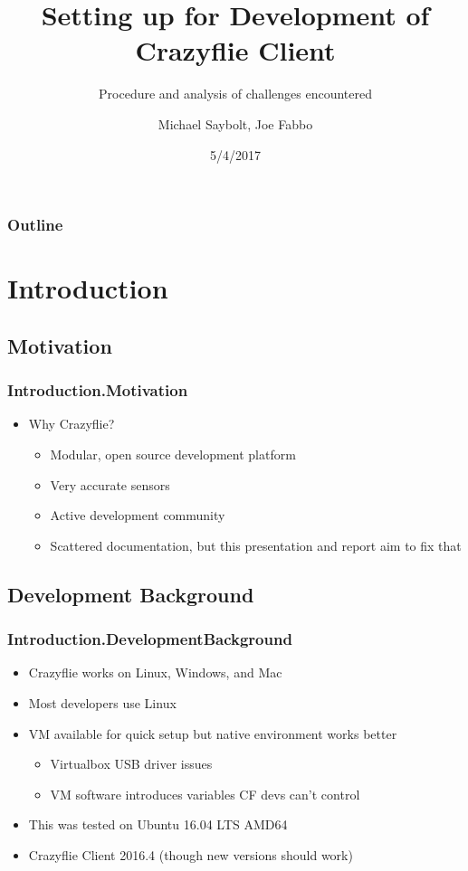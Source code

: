 \documentclass[t]{beamer} %
\begin{document}
\begin{frame}
\title{Setting up for Development of Crazyflie Client}
\subtitle{Procedure and analysis of challenges encountered}
\author{Michael Saybolt, Joe Fabbo}
\date{5/4/2017}
\titlepage
\end{frame}

\begin{frame}
	\frametitle{Outline}
	\tableofcontents
\end{frame}

\section{Introduction}
\subsection{Motivation}
\begin{frame}
	\frametitle{Introduction.Motivation}
	\begin{itemize}
		\item{Why Crazyflie?}
		\begin{itemize}
			\item Modular, open source development platform
			\item Very accurate sensors
			\item Active development community
			\item Scattered documentation, but this presentation and report aim to fix that
		\end{itemize}
	\end{itemize} %
\end{frame}

\subsection{Development Background}
\begin{frame} %
	\frametitle{Introduction.DevelopmentBackground}
	\begin{itemize}
		\item{Crazyflie works on Linux, Windows, and Mac}
		\item{Most developers use Linux}
		\item VM available for quick setup but native environment works better
			\begin{itemize}
				\item Virtualbox USB driver issues
				\item VM software introduces variables CF devs can't control
			\end{itemize}
		\item{This was tested on Ubuntu 16.04 LTS AMD64}
		\item Crazyflie Client 2016.4 (though new versions should work)
	\end{itemize}
\end{frame}
\end{document}
